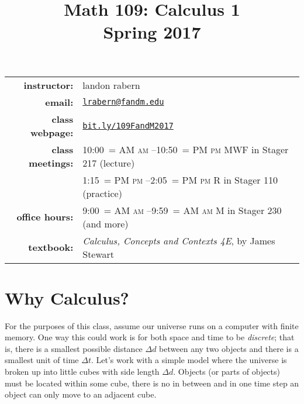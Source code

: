 \documentclass[12pt]{article}
\title{Math 109: Calculus 1\\ \bigskip\small{Spring 2017}}
\date{}
\makeatletter
\DeclareRobustCommand{\maybefakesc}[1]{%
  \ifnum\pdfstrcmp{\f@series}{\bfdefault}=\z@
    {\fontsize{\dimexpr0.8\dimexpr\f@size pt\relax}{0}\selectfont\uppercase{#1}}%
  \else
    \textsc{#1}%
  \fi
}
\newcommand\AM{\,\maybefakesc{am}\xspace}
\newcommand\PM{\,\maybefakesc{pm}\xspace}
\makeatother
\begin{document}
\maketitle

\begin{tabular}{r l}
\textbf{instructor:}& landon rabern\\
\textbf{email:}& \href{mailto:lrabern@fandm.edu}{\nolinkurl{lrabern@fandm.edu}}\\
\textbf{class webpage:}& \href{http://bit.ly/109FandM2017}{\nolinkurl{bit.ly/109FandM2017}}\\
\textbf{class meetings:}& 10:00\AM--10:50\PM MWF in Stager 217 (lecture)\\
& 1:15\PM--2:05\PM R in Stager 110 (practice)\\
\textbf{office hours:}& 9:00\AM--9:59\AM M in Stager 230 (and more)\\
\textbf{textbook:}&\textit{Calculus, Concepts and Contexts 4E}, by James Stewart\\
\end{tabular}

\bigskip

\section*{Why Calculus?}
For the purposes of this class, assume our universe runs on a computer with finite memory.  One way this could work is for both space and time to be \emph{discrete}; that is, there is a smallest possible distance $\Delta d$ between any two objects and there is a smallest unit of time $\Delta t$.  Let's work with a simple model where the universe is broken up into little cubes with side length $\Delta d$.  Objects (or parts of objects) must be located within some cube, there is no in between and in one time step an object can only move to an adjacent cube.  
\end{document}
